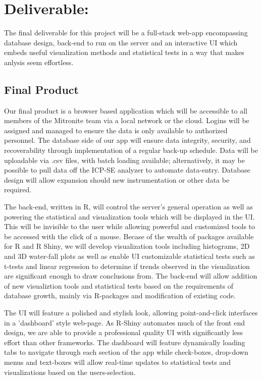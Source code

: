 \documentclass[10pt,twocolumn,letterpaper]{article}
\begin{document}
    	\section{Deliverable:}

        The final deliverable for this project will be a full-stack web-app encompassing database design, back-end to run on the server and an interactive UI which embeds useful visualization methods and statistical tests in a way that makes anlysis seem effortless.

            \subsection{Final Product}

            Our final product is a browser based application which will be accessible to all members of the Mitronite team via a local network or the cloud. Logins will be assigned and managed to ensure the data is only available to authorized personnel. The database side of our app will ensure data integrity, security, and recoverability through implementation of a regular back-up schedule. Data will be uploadable via .csv files, with batch loading available; alternatively, it may be possible to pull data off the ICP-SE analyzer to automate data-entry. Database design will allow expansion should new instrumentation or other data be required.

            The back-end, written in R, will control the server's general operation as well as powering the statistical and visualization tools which will be displayed in the UI. This will be invisible to the user while allowing powerful and customized tools to be accessed with the click of a mouse. Becase of the wealth of packages available for R and R Shiny, we will develop visualization tools including histograms, 2D and 3D water-fall plots as well as enable UI customizable statistical tests such as t-tests and linear regression to determine if trends observed in the visualization are significant enough to draw conclusions from. The back-end will allow addition of new visualiztion tools and statistical tests based on the requirements of database growth, mainly via R-packages and modification of existing code.


            The UI will feature a polished and stylish look, allowing point-and-click interfaces in a 'dashboard' style web-page. As R-Shiny automates much of the front end design, we are able to provide a professional quality UI with significantly less effort than other frameworks. The dashboard will feature dynamically loading tabs to navigate through each section of the app while check-boxes, drop-down menus and text-boxes will allow real-time updates to statistical tests and visualizations based on the users-selection. 
\end{document}
